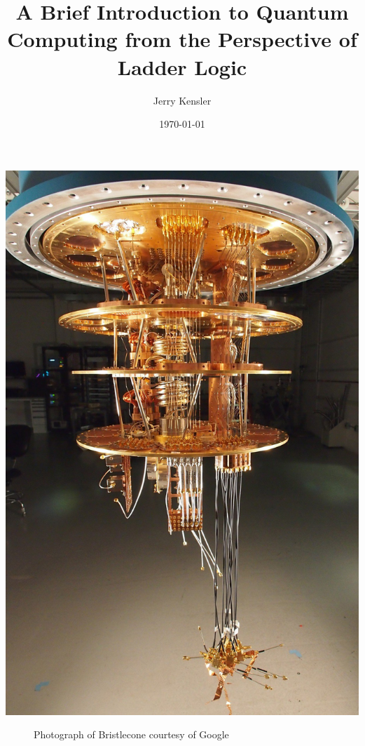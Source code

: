 \documentclass[a4paper]{article}
\title{A Brief Introduction to Quantum Computing from the Perspective of Ladder Logic\vspace{-0ex}}
\author{Jerry Kensler\vspace{-0ex}}
\date{\today\vspace{-0ex}}
\begin{document}
	
		\maketitle %
		\let\originalnewpage\newpage \let\newpage\relax \let\newpage\originalnewpage
		\begin{center}		\includegraphics[scale=0.12]{googlequantumcomputer} %
		\end{center}
	\textcolor{mygray}{
			\begin{figure}%
			\caption{Photograph of Bristlecone courtesy of Google~\cite{coverImage}}\label{titleImage} %
			\end{figure}}
\end{document}
